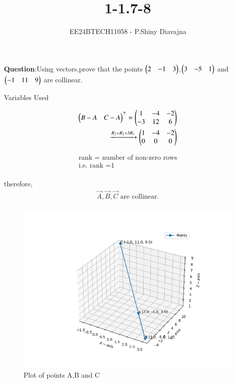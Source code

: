 \documentclass[journal]{IEEEtran}
\begin{document}

\vspace{3cm}

\title{1-1.7-8}
\author{EE24BTECH11058 - P.Shiny Diavajna}
{\let\newpage\relax\maketitle}

\renewcommand{\thefigure}{\theenumi}
\renewcommand{\thetable}{\theenumi}
\setlength{\intextsep}{10pt} %


\renewcommand{\thetable}{\theenumi}


\textbf{Question}:Using vectors,prove that the points $\begin{pmatrix}2 & -1 & 3\end{pmatrix}$,$\begin{pmatrix}3 & -5 & 1\end{pmatrix}$ and $\begin{pmatrix}-1 & 11 & 9\end{pmatrix}$ are collinear. \\

\solution 
\begin{table}[h!]    
  \centering
  
  \caption{Variables Used}
  \label{tab1-1.7-8.1}
\end{table}

  \begin{align}
	\begin{pmatrix}B-A & C-A\end{pmatrix}^\top =\begin{pmatrix}1 & -4 & -2 \\-3 & 12 &6\end{pmatrix}\\
	\xrightarrow{R_2=R_2+3R_1} \begin{pmatrix}1 & -4 &-2\\ 0 & 0 &0\end{pmatrix}\\ 
  \end{align} 

  \begin{align}
	\text{rank = number of non-zero rows}\\
	\text{i.e. rank =1}\\
  \end{align}
	

therefore,\\ 
\begin{align}	
	\vec{A}, \vec{B} , \vec{C} \text{ are collinear.}\\
\end{align}



  \begin{figure}[h!]
   \centering
   \includegraphics[width=0.7\linewidth]{figs/Figure_3.png}
   \caption{Plot of points A,B and C}
  \end{figure}
\end{document}
